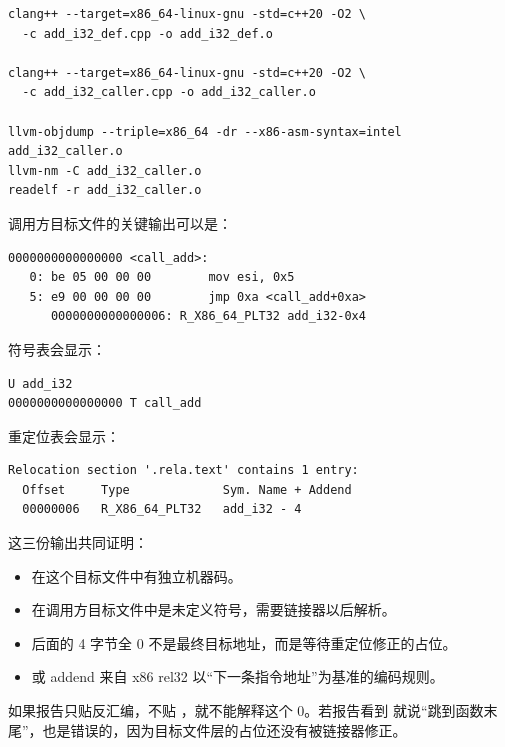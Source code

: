 \begin{lstlisting}[numbers=none,caption={生成目标文件并观察}]
clang++ --target=x86_64-linux-gnu -std=c++20 -O2 \
  -c add_i32_def.cpp -o add_i32_def.o

clang++ --target=x86_64-linux-gnu -std=c++20 -O2 \
  -c add_i32_caller.cpp -o add_i32_caller.o

llvm-objdump --triple=x86_64 -dr --x86-asm-syntax=intel add_i32_caller.o
llvm-nm -C add_i32_caller.o
readelf -r add_i32_caller.o
\end{lstlisting}

调用方目标文件的关键输出可以是：

\begin{lstlisting}[numbers=none,caption={调用方目标文件的机器码和 relocation}]
0000000000000000 <call_add>:
   0: be 05 00 00 00        mov esi, 0x5
   5: e9 00 00 00 00        jmp 0xa <call_add+0xa>
      0000000000000006: R_X86_64_PLT32 add_i32-0x4
\end{lstlisting}

符号表会显示：

\begin{lstlisting}[numbers=none,caption={调用方符号表}]
                 U add_i32
0000000000000000 T call_add
\end{lstlisting}

重定位表会显示：

\begin{lstlisting}[numbers=none,caption={调用方重定位表}]
Relocation section '.rela.text' contains 1 entry:
  Offset     Type             Sym. Name + Addend
  00000006   R_X86_64_PLT32   add_i32 - 4
\end{lstlisting}

这三份输出共同证明：

\begin{itemize}
  \item {} 在这个目标文件中有独立机器码。
  \item {} 在调用方目标文件中是未定义符号，需要链接器以后解析。
  \item \code{jmp} 后面的 4 字节全 0 不是最终目标地址，而是等待重定位修正的占位。
  \item \code{-0x4} 或 \code{-4} addend 来自 x86 rel32 以“下一条指令地址”为基准的编码规则。
\end{itemize}

如果报告只贴反汇编，不贴 ，就不能解释这个 0。若报告看到  就说“跳到函数末尾”，也是错误的，因为目标文件层的占位还没有被链接器修正。


